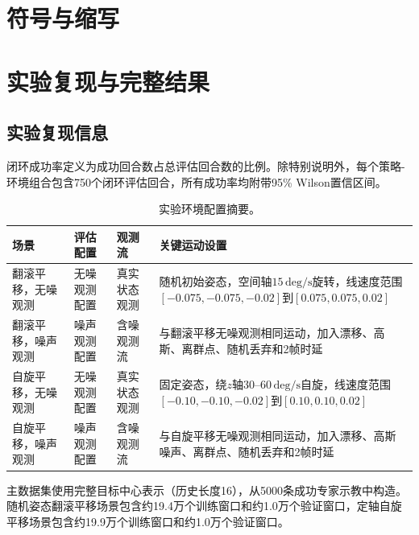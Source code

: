 \chapter{符号与缩写}\label{app:symbols}



\chapter{实验复现与完整结果}\label{app:reproducibility}

\section{实验复现信息}

闭环成功率定义为成功回合数占总评估回合数的比例。除特别说明外，每个策略-环境组合包含750个闭环评估回合，所有成功率均附带95\% Wilson置信区间。

\begin{table}[!htbp]
    \caption{实验环境配置摘要。}
    \label{tab:env-summary}
    \centering
    \small
    \renewcommand{\arraystretch}{1.15}
    \begin{tabularx}{\textwidth}{>{\raggedright\arraybackslash}p{}>{\raggedright\arraybackslash}p{}>{\raggedright\arraybackslash}p{}Y}
        \hline
        场景 & 评估配置 & 观测流 & 关键运动设置 \\
        \hline
        翻滚平移，无噪观测 & 无噪观测配置 & 真实状态观测 & 随机初始姿态，空间轴$15\,\mathrm{deg/s}$旋转，线速度范围$[-0.075,-0.075,-0.02]$到$[0.075,0.075,0.02]$ \\
        翻滚平移，噪声观测 & 噪声观测配置 & 含噪观测流 & 与翻滚平移无噪观测相同运动，加入漂移、高斯、离群点、随机丢弃和2帧时延 \\
        自旋平移，无噪观测 & 无噪观测配置 & 真实状态观测 & 固定姿态，绕$z$轴$30$--$60\,\mathrm{deg/s}$自旋，线速度范围$[-0.10,-0.10,-0.02]$到$[0.10,0.10,0.02]$ \\
        自旋平移，噪声观测 & 噪声观测配置 & 含噪观测流 & 与自旋平移无噪观测相同运动，加入漂移、高斯噪声、离群点、随机丢弃和2帧时延 \\
        \hline
    \end{tabularx}
\end{table}

主数据集使用完整目标中心表示（历史长度16），从5000条成功专家示教中构造。随机姿态翻滚平移场景包含约19.4万个训练窗口和约1.0万个验证窗口，定轴自旋平移场景包含约19.9万个训练窗口和约1.0万个验证窗口。

